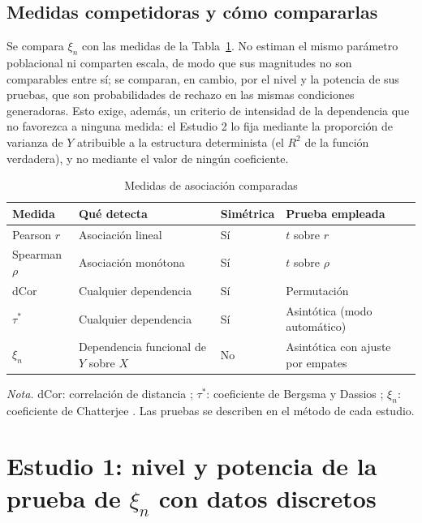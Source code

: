 \documentclass[man,donotrepeattitle,floatsintext]{apa7}
\begin{document}
\subsection{Medidas competidoras y cómo compararlas}

Se compara $\xi_n$ con las medidas de la Tabla~\ref{tab:medidas}. No estiman el mismo parámetro poblacional ni comparten escala, de modo que sus magnitudes no son comparables entre sí; se comparan, en cambio, por el nivel y la potencia de sus pruebas, que son probabilidades de rechazo en las mismas condiciones generadoras. Esto exige, además, un criterio de intensidad de la dependencia que no favorezca a ninguna medida: el Estudio 2 lo fija mediante la proporción de varianza de $Y$ atribuible a la estructura determinista (el $R^2$ de la función verdadera), y no mediante el valor de ningún coeficiente.

\begin{table}
\caption{Medidas de asociación comparadas}
\label{tab:medidas}
\begin{threeparttable}
\small
\begin{tabular}{llll}
\toprule
Medida & Qué detecta & Simétrica & Prueba empleada \\
\midrule
Pearson $r$ & Asociación lineal & Sí & $t$ sobre $r$ \\
Spearman $\rho$ & Asociación monótona & Sí & $t$ sobre $\rho$ \\
dCor & Cualquier dependencia & Sí & Permutación \\
$\tau^*$ & Cualquier dependencia & Sí & Asintótica (modo automático) \\
$\xi_n$ & Dependencia funcional de $Y$ sobre $X$ & No & Asintótica con ajuste por empates \\
\bottomrule
\end{tabular}
\begin{tablenotes}[flushleft]
\small
\item \textit{Nota.} dCor: correlación de distancia \parencite{szekely2007}; $\tau^*$: coeficiente de Bergsma y Dassios \parencite{bergsma2014}; $\xi_n$: coeficiente de Chatterjee \parencite{chatterjee2021}. Las pruebas se describen en el método de cada estudio.
\end{tablenotes}
\end{threeparttable}
\end{table}

\section{Estudio 1: nivel y potencia de la prueba de $\xi_n$ con datos discretos}
\end{document}
